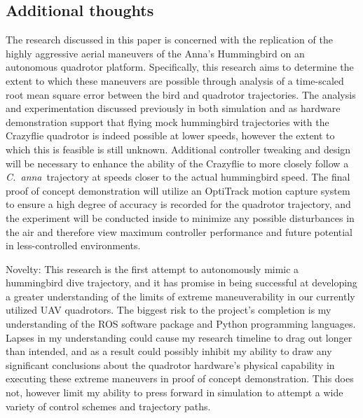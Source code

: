 \documentclass[onecolumn,10pt]{IEEEtran}
\newcommand{\Canna}{\emph{C.~anna}}
\begin{document}
\subsection{Additional thoughts}
The research discussed in this paper is concerned with the replication of the highly aggressive aerial maneuvers of the Anna’s Hummingbird on an autonomous quadrotor platform. Specifically, this research aims to determine the extent to which these maneuvers are possible through analysis of a time-scaled root mean square error between the bird and quadrotor trajectories. The analysis and experimentation discussed previously in both simulation and as hardware demonstration support that flying mock hummingbird trajectories with the Crazyflie quadrotor is indeed possible at lower speeds, however the extent to which this is feasible is still unknown. Additional controller tweaking and design will be necessary to enhance the ability of the Crazyflie to more closely follow a \Canna\ trajectory at speeds closer to the actual hummingbird speed. The final proof of concept demonstration will utilize an OptiTrack motion capture system to ensure a high degree of accuracy is recorded for the quadrotor trajectory, and the experiment will be conducted inside to minimize any possible disturbances in the air and therefore view maximum controller performance and future potential in less-controlled environments. 

Novelty: This research is the first attempt to autonomously mimic a hummingbird dive trajectory, and it has promise in being successful at developing a greater understanding of the limits of extreme maneuverability in our currently utilized UAV quadrotors. The biggest risk to the project’s completion is my understanding of the ROS software package and Python programming languages. Lapses in my understanding could cause my research timeline to drag out longer than intended, and as a result could possibly inhibit my ability to draw any significant conclusions about the quadrotor hardware's physical capability in executing these extreme maneuvers in proof of concept demonstration. This does not, however limit my ability to press forward in simulation to attempt a wide variety of control schemes and trajectory paths.
\end{document}
